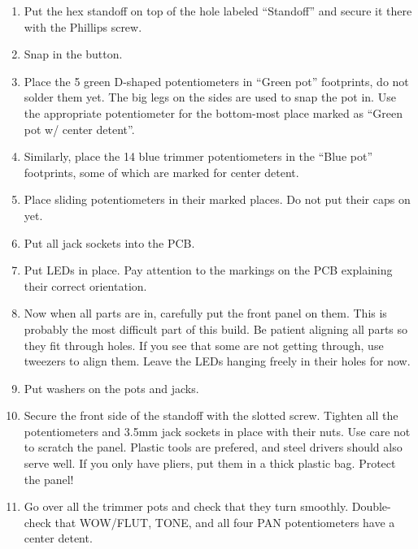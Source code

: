 \documentclass[10pt,a4paper,twocolumn]{article}
\begin{document}
\begin{enumerate}
  \item Put the hex standoff on top of the hole labeled ``Standoff'' and secure
    it there with the Phillips screw.
  \item Snap in the button.
  \item Place the 5 green D-shaped potentiometers in ``Green pot''
    footprints, do not solder them yet. The big legs on the sides are used to
    snap the pot in. Use the appropriate potentiometer for the bottom-most
    place marked as ``Green pot w/ center detent''.
  \item Similarly, place the 14 blue trimmer potentiometers in the ``Blue pot''
    footprints, some of which are marked for center detent.
  \item Place sliding potentiometers in their marked places. Do not put their
    caps on yet.
  \item Put all jack sockets into the PCB.
  \item Put LEDs in place. Pay attention to the markings on the PCB explaining
    their correct orientation.
  \item Now when all parts are in, carefully put the front panel on them.
    This is probably the most difficult part of this build. Be patient aligning
    all parts so they fit through holes. If you see that some are not getting
    through, use tweezers to align them. Leave the LEDs hanging freely in their
    holes for now.
  \item Put washers on the pots and jacks.
  \item Secure the front side of the standoff with the slotted screw. Tighten
    all the potentiometers and 3.5mm jack sockets in place with their nuts.
    Use care not to scratch the panel. Plastic tools are prefered,
    and steel drivers should also serve well. If you only have pliers, put them
    in a thick plastic bag. Protect the panel!
  \item Go over all the trimmer pots and check that they turn smoothly.
    Double-check that WOW/FLUT, TONE, and all four PAN potentiometers have a
    center detent.
\end{enumerate}
\end{document}
